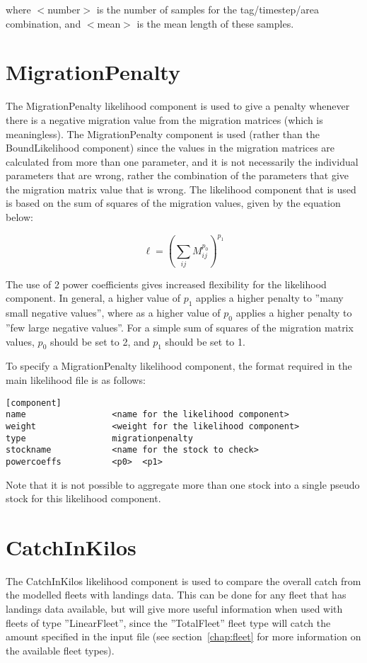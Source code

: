 \documentclass[10pt,twoside]{book}
\begin{document}
where $<$number$>$ is the number of samples for the tag/timestep/area combination, and $<$mean$>$ is the mean length of these samples.

\section{MigrationPenalty}\label{sec:migpenalty}
The MigrationPenalty likelihood component is used to give a penalty whenever there is a negative migration value from the migration matrices (which is meaningless).  The MigrationPenalty component is used (rather than the BoundLikelihood component) since the values in the migration matrices are calculated from more than one parameter, and it is not necessarily the individual parameters that are wrong, rather the combination of the parameters that give the migration matrix value that is wrong.  The likelihood component that is used is based on the sum of squares of the migration values, given by the equation below:

\begin{equation}\label{eq:migpenalty}
\ell = \left( \sum_{ij}^{} M_{ij}^{p_0} \right)^{p_1}
\end{equation}

\bigskip
The use of 2 power coefficients gives increased flexibility for the likelihood component.  In general, a higher value of $p_1$ applies a higher penalty to ''many small negative values'', where as a higher value of $p_0$ applies a higher penalty to ''few large negative values''.  For a simple sum of squares of the migration matrix values, $p_0$ should be set to 2, and $p_1$ should be set to 1.

\bigskip
To specify a MigrationPenalty likelihood component, the format required in the main likelihood file is as follows:

{\small\begin{verbatim}
[component]
name                 <name for the likelihood component>
weight               <weight for the likelihood component>
type                 migrationpenalty
stockname            <name for the stock to check>
powercoeffs          <p0>  <p1>
\end{verbatim}}

Note that it is not possible to aggregate more than one stock into a single pseudo stock for this likelihood component.

\section{CatchInKilos}\label{sec:catchinkilos}
The CatchInKilos likelihood component is used to compare the overall catch from the modelled fleets with landings data.  This can be done for any fleet that has landings data available, but will give more useful information when used with fleets of type ''LinearFleet'', since the ''TotalFleet'' fleet type will catch the amount specified in the input file (see section~\ref{chap:fleet} for more information on the available fleet types).
\end{document}
